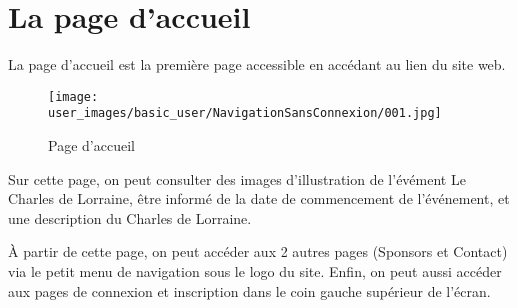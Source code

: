 \section{La page d'accueil}

La page d'accueil est la première page accessible en accédant au lien du site web.

\begin{figure}[H]
\centering
\texttt{[image: user\_images/basic\_user/NavigationSansConnexion/001.jpg]}
\caption{Page d'accueil}
\end{figure}

Sur cette page, on peut consulter des images d'illustration de l'évément Le Charles de Lorraine, être informé de la date de commencement de l'événement, et une description du Charles de Lorraine.\newline

À partir de cette page, on peut accéder aux 2 autres pages (Sponsors et Contact) via le petit menu de navigation sous le logo du site. Enfin, on peut aussi accéder aux pages de connexion et inscription dans le coin gauche supérieur de l'écran.